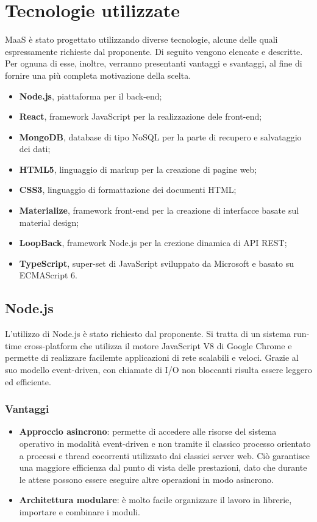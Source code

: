 \section{Tecnologie utilizzate}
MaaS \`e stato progettato utilizzando diverse tecnologie, alcune delle quali espressamente richieste dal proponente. Di seguito vengono elencate e descritte. Per ognuna di esse, inoltre, verranno presentanti vantaggi e svantaggi, al fine di fornire una pi\`u completa motivazione della scelta.
\begin{itemize}
\item \textbf{Node.js}, piattaforma per il back-end;
\item \textbf{React}, framework JavaScript per la realizzazione dele front-end;
\item \textbf{MongoDB}, database di tipo NoSQL per la parte di recupero e salvataggio dei dati;
\item \textbf{HTML5}, linguaggio di markup per la creazione di pagine web;
\item \textbf{CSS3}, linguaggio di formattazione dei documenti HTML;
\item \textbf{Materialize}, framework front-end per la creazione di interfacce basate sul material design;
\item \textbf{LoopBack}, framework Node.js per la crezione dinamica di API REST;
\item \textbf{TypeScript}, super-set di JavaScript sviluppato da Microsoft e basato su ECMAScript 6.
\end{itemize}
\subsection{Node.js}
L'utilizzo di Node.js \`e stato richiesto dal proponente. Si tratta di un sistema run-time cross-platform che utilizza il motore JavaScript V8 di Google Chrome e permette di realizzare facilemte applicazioni di rete scalabili e veloci. Grazie al suo modello event-driven, con chiamate di I/O non bloccanti risulta essere leggero ed efficiente.
\subsubsection{Vantaggi}
\begin{itemize}
\item \textbf{Approccio asincrono}: permette di accedere alle risorse del sistema operativo in modalit\`a event-driven e non tramite il classico processo orientato a processi e thread cocorrenti utilizzato dai classici server web. Ci\`o garantisce una maggiore efficienza dal punto di vista delle prestazioni, dato che durante le attese possono essere eseguire altre operazioni in modo asincrono.
\item \textbf{Architettura modulare}: \`e molto facile organizzare il lavoro in librerie, importare e combinare i moduli.
\end{itemize}

